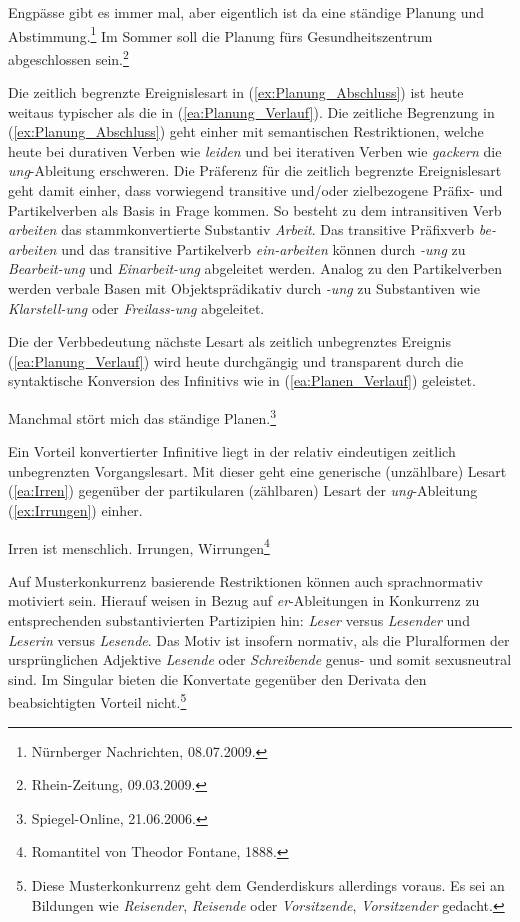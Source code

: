\ea \label{ea:Planung}
\ea \label{ea:Planung_Verlauf} Engpässe gibt es immer mal, aber eigentlich ist da eine ständige Planung und Abstimmung.\footnote{Nürnberger Nachrichten, 08.07.2009.}
\ex \label{ex:Planung_Abschluss} Im Sommer soll die Planung fürs Gesundheitszentrum abgeschlossen sein.\footnote{Rhein-Zeitung, 09.03.2009.}
\z 
\z 

Die zeitlich begrenzte Ereignislesart in (\ref{ex:Planung_Abschluss}) ist heute weitaus typischer als die in (\ref{ea:Planung_Verlauf}). Die zeitliche Begrenzung in (\ref{ex:Planung_Abschluss}) geht einher mit semantischen Restriktionen, welche heute bei durativen Verben wie \textit{leiden} und bei iterativen Verben wie \textit{gackern} die \textit{ung}-Ableitung erschweren. Die Präferenz für die zeitlich begrenzte Ereignislesart geht damit einher, dass vorwiegend transitive und/oder zielbezogene Präfix- und Partikelverben als Basis in Frage kommen. So besteht zu dem intransitiven Verb \textit{arbeiten} das stammkonvertierte Substantiv \textit{Arbeit}. Das transitive Präfixverb \textit{be-arbeiten} und das transitive Partikelverb \textit{ein-arbeiten} können durch \textit{-ung} zu \textit{Bearbeit-ung} und \textit{Einarbeit-ung} abgeleitet werden. Analog zu den Partikelverben werden verbale Basen mit Objektsprädikativ durch \textit{-ung} zu Substantiven wie \textit{Klarstell-ung} oder \textit{Freilass-ung} abgeleitet. 

Die der Verbbedeutung nächste Lesart als zeitlich unbegrenztes Ereignis (\ref{ea:Planung_Verlauf}) wird heute durchgängig und transparent durch die syntaktische Konversion des Infinitivs wie in (\ref{ea:Planen_Verlauf}) geleistet.

\ea \label{ea:Planen_Verlauf} Manchmal stört mich das ständige Planen.\footnote{Spiegel-Online, 21.06.2006.}
\z 

Ein Vorteil konvertierter Infinitive liegt in der relativ eindeutigen zeitlich unbegrenzten Vorgangslesart. Mit dieser geht eine generische (unzählbare) Lesart (\ref{ea:Irren}) gegenüber der partikularen (zählbaren) Lesart der \textit{ung}-Ableitung (\ref{ex:Irrungen}) einher.

\ea \label{ea:Irren_Irrungen}
\ea \label{ea:Irren} Irren ist menschlich.
\ex \label{ex:Irrungen} Irrungen, Wirrungen\footnote{Romantitel von Theodor Fontane, 1888.}
\z 
\z 

Auf Musterkonkurrenz basierende Restriktionen können auch sprachnormativ motiviert sein. Hierauf weisen \citet[134]{FuhrhopWerner2016} in Bezug auf \textit{er}-Ableitungen in Konkurrenz zu entsprechenden substantivierten Partizipien hin: \textit{Leser} versus \textit{Lesender} und \textit{Leserin} versus \textit{Lesende}. Das Motiv ist insofern normativ, als die Pluralformen der ursprünglichen Adjektive \textit{Lesende} oder \textit{Schreibende} genus- und somit sexusneutral sind. Im Singular bieten die Konvertate gegenüber den Derivata den beabsichtigten Vorteil nicht.\footnote{Diese Musterkonkurrenz geht dem Genderdiskurs allerdings voraus. Es sei an Bildungen wie \textit{Reisender}, \textit{Reisende} oder \textit{Vorsitzende}, \textit{Vorsitzender} gedacht.}


